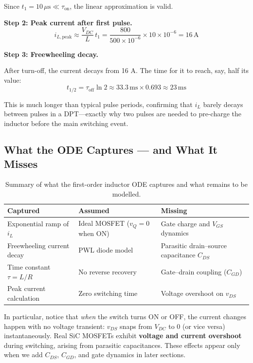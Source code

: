 \documentclass[11pt, a4paper]{article}
\begin{document}
Since $t_1 = 10\,\mu\text{s} \ll \tau_{\text{on}}$, the linear approximation is valid.

\textbf{Step 2: Peak current after first pulse.}
\[
    i_{L,\text{peak}} \approx \frac{V_{DC}}{L}\,t_1 = \frac{800}{500\times10^{-6}}\times10\times10^{-6} = 16\,\text{A}
\]

\textbf{Step 3: Freewheeling decay.}

After turn-off, the current decays from 16 A. The time for it to reach, say, half its value:
\[
    t_{1/2} = \tau_{\text{off}}\ln 2 \approx 33.3\,\text{ms} \times 0.693 \approx 23\,\text{ms}
\]

This is much longer than typical pulse periods, confirming that $i_L$ barely decays between pulses in a DPT—exactly why two pulses are needed to pre-charge the inductor before the main switching event.

\subsection{What the ODE Captures — and What It Misses}

\begin{table}[h]
\centering
\small
\begin{tabular}{p{4.5cm}p{4.5cm}p{4.5cm}}
\toprule
\textbf{Captured} & \textbf{Assumed} & \textbf{Missing} \\
\midrule
Exponential ramp of $i_L$ & Ideal MOSFET ($v_Q = 0$ when ON) & Gate charge and $V_{GS}$ dynamics \\
Freewheeling current decay & PWL diode model & Parasitic drain–source capacitance $C_{DS}$ \\
Time constant $\tau = L/R$ & No reverse recovery & Gate–drain coupling ($C_{GD}$) \\
Peak current calculation & Zero switching time & Voltage overshoot on $v_{DS}$ \\
\bottomrule
\end{tabular}
\caption{Summary of what the first-order inductor ODE captures and what remains to be modelled.}
\label{tab:ode_summary}
\end{table}

\noindent In particular, notice that \emph{when} the switch turns ON or OFF, the current changes happen with no voltage transient: $v_{DS}$ snaps from $V_{DC}$ to $0$ (or vice versa) instantaneously. Real SiC MOSFETs exhibit \textbf{voltage and current overshoot} during switching, arising from parasitic capacitances. These effects appear only when we add $C_{DS}$, $C_{GD}$, and gate dynamics in later sections.
\end{document}
